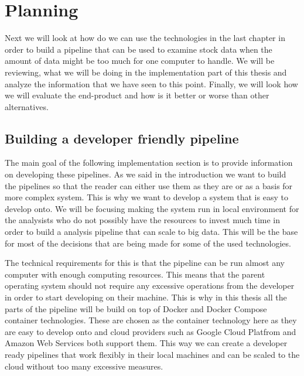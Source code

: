 \chapter{Planning}
\label{chapter:methods}


Next we will look at how do we can use the technologies in the last chapter in order to build a pipeline that can be used to examine stock data when the amount of data might be too much for one computer to handle.
We will be reviewing, what we will be doing in the implementation part of this thesis and analyze the information that we have seen to this point.
Finally, we will look how we will evaluate the end-product and how is it better or worse than other alternatives.

\section{Building a developer friendly pipeline}

The main goal of the following implementation section is to provide information on developing these pipelines.
As we said in the introduction we want to build the pipelines so that the reader can either use them as they are or as a basis for more complex system.
This is why we want to develop a system that is easy to develop onto.
We will be focusing making the system run in local environment for the analysists who do not possibly have the resources to invest much time in order to build a analysis pipeline that can scale to big data.
This will be the base for most of the decisions that are being made for some of the used technologies.

The technical requirements for this is that the pipeline can be run almost any computer with enough computing resources.
This means that the parent operating system should not require any excessive operations from the developer in order to start developing on their machine.
This is why in this thesis all the parts of the pipeline will be build on top of Docker and Docker Compose container technologies.
These are chosen as the container technology here as they are easy to develop onto and cloud providers such as Google Cloud Platfrom and Amazon Web Services both support them. \cite{awsdocker} \cite{gcpdocker}
This way we can create a developer ready pipelines that work flexibly in their local machines and can be scaled to the cloud without too many excessive measures.

